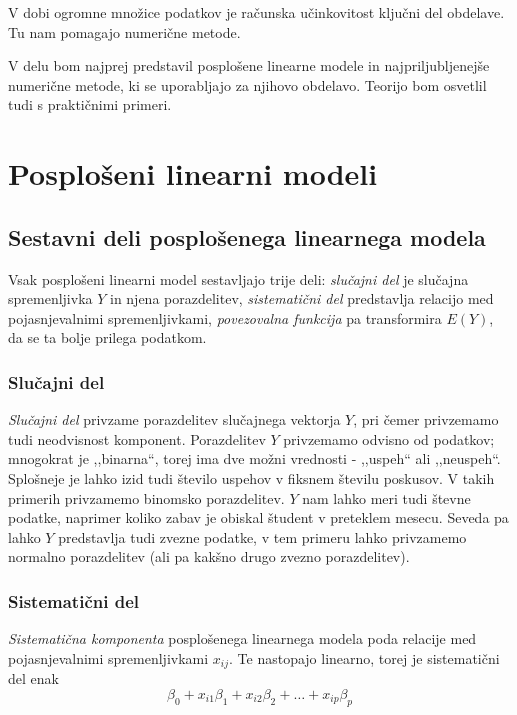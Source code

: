 \documentclass[12pt,a4paper]{amsart}
\theoremstyle{definition} %
\theoremstyle{plain} %
\begin{document}
V dobi ogromne množice podatkov je računska učinkovitost ključni del obdelave. Tu nam pomagajo numerične metode.

V delu bom najprej predstavil posplošene linearne modele in najpriljubljenejše numerične metode, ki se uporabljajo za njihovo obdelavo. 
Teorijo bom osvetlil tudi s praktičnimi primeri.

\section{Posplošeni linearni modeli}

\subsection{Sestavni deli posplošenega linearnega modela}
Vsak posplošeni linearni model sestavljajo trije deli: \textit{slučajni del} je slučajna spremenljivka $Y$ in njena porazdelitev, 
\textit{sistematični del} predstavlja relacijo med pojasnjevalnimi spremenljivkami, \textit{povezovalna funkcija} pa transformira $E(Y)$, da se ta
bolje prilega podatkom.

\subsubsection{Slučajni del}
\textit{Slučajni del} privzame porazdelitev slučajnega vektorja $Y$, pri čemer privzemamo tudi neodvisnost komponent. Porazdelitev $Y$
privzemamo odvisno od podatkov; mnogokrat je ,,binarna``, torej ima dve možni vrednosti - ,,uspeh`` ali ,,neuspeh``. Splošneje je lahko izid tudi 
število uspehov v fiksnem številu poskusov. V takih primerih privzamemo binomsko porazdelitev. $Y$ nam lahko meri tudi števne podatke, naprimer 
koliko zabav je obiskal študent v preteklem mesecu. Seveda pa lahko $Y$ predstavlja tudi zvezne podatke,
v tem primeru lahko privzamemo normalno porazdelitev (ali pa kakšno drugo zvezno porazdelitev).
\subsubsection{Sistematični del} 
\textit{Sistematična komponenta} posplošenega linearnega modela poda relacije med pojasnjevalnimi spremenljivkami $x_{ij}$. Te nastopajo 
linearno, torej je sistematični del enak
\[
\beta_{0} + x_{i1}\beta_{1} + x_{i2}\beta_{2} + \ldots + x_{ip}\beta_{p}
\]
\end{document}
